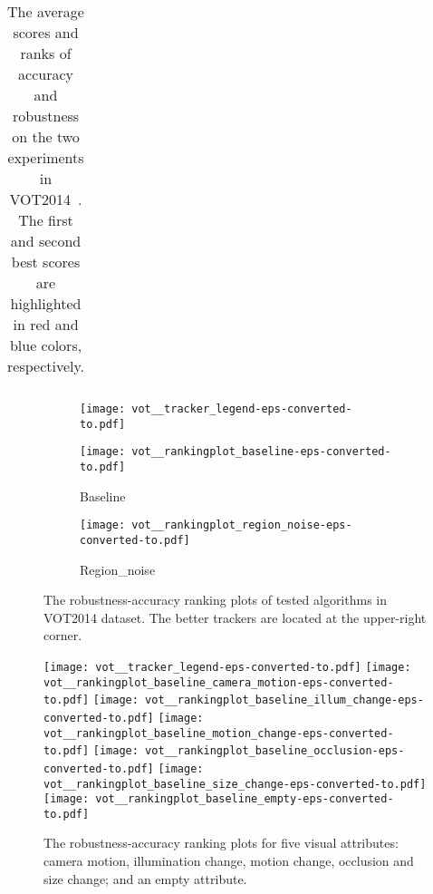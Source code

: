 \documentclass[10pt,twocolumn,letterpaper]{article}
\begin{document}
\begin{table*}
\begin{center}
\begin{subtable}{0.48\textwidth}
\begin{tabular}{c|c c|c c||c}
\end{tabular}
\vspace{-1mm}
\end{subtable}
\end{center}
\vspace{-5mm}
\caption{The average scores and ranks of accuracy and robustness on the two experiments in VOT2014~\cite{vot14}. The first and second best scores are highlighted in red and blue colors, respectively.}
\label{tab:vot}
\end{table*}

\begin{figure}[t]
\begin{center}
\begin{subfigure}{\linewidth}
\texttt{[image: vot\_\_tracker\_legend-eps-converted-to.pdf]}
\end{subfigure}
\begin{subfigure}{0.49\linewidth}
\texttt{[image: vot\_\_rankingplot\_baseline-eps-converted-to.pdf]}
\caption{Baseline}
\label{fig:otb50}
\end{subfigure}
\begin{subfigure}{0.49\linewidth}
\texttt{[image: vot\_\_rankingplot\_region\_noise-eps-converted-to.pdf]}
\caption{Region\_noise}
\label{fig:otb100}
\end{subfigure}
\end{center}
\vspace{-5mm}
\caption{The robustness-accuracy ranking plots of tested algorithms in VOT2014 dataset. The better trackers are located at the upper-right corner.}
\label{fig:vot}
\end{figure}

\begin{figure}[t]
\vspace{-2mm}
\begin{center}
\texttt{[image: vot\_\_tracker\_legend-eps-converted-to.pdf]}
\texttt{[image: vot\_\_rankingplot\_baseline\_camera\_motion-eps-converted-to.pdf]}
\texttt{[image: vot\_\_rankingplot\_baseline\_illum\_change-eps-converted-to.pdf]}
\texttt{[image: vot\_\_rankingplot\_baseline\_motion\_change-eps-converted-to.pdf]}
\texttt{[image: vot\_\_rankingplot\_baseline\_occlusion-eps-converted-to.pdf]}
\texttt{[image: vot\_\_rankingplot\_baseline\_size\_change-eps-converted-to.pdf]}
\texttt{[image: vot\_\_rankingplot\_baseline\_empty-eps-converted-to.pdf]}
\end{center}
\vspace{-5mm}
\caption{The robustness-accuracy ranking plots for five visual attributes: camera motion, illumination change, motion change, occlusion and  size change; and an empty attribute.}
\label{fig:vot_attributes}
\end{figure}
\end{document}
